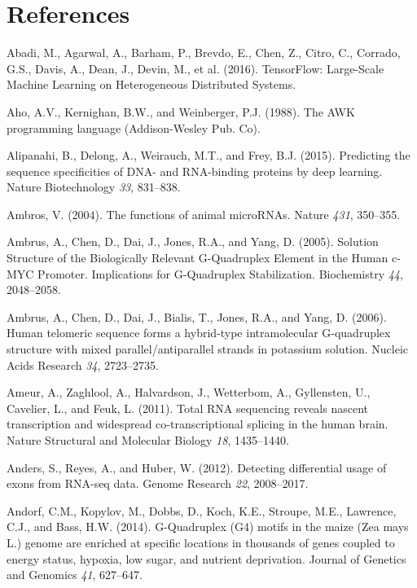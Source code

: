 \documentclass[12pt,a4paper,]{report}
\begin{document}
\newpage
\section*{References}

\hypertarget{refs}{}
\leavevmode\hypertarget{ref-Abadi2016}{}%
Abadi, M., Agarwal, A., Barham, P., Brevdo, E., Chen, Z., Citro, C.,
Corrado, G.S., Davis, A., Dean, J., Devin, M., et al. (2016).
TensorFlow: Large-Scale Machine Learning on Heterogeneous Distributed
Systems.

\leavevmode\hypertarget{ref-Aho1988}{}%
Aho, A.V., Kernighan, B.W., and Weinberger, P.J. (1988). The AWK
programming language (Addison-Wesley Pub. Co).

\leavevmode\hypertarget{ref-Alipanahi2015}{}%
Alipanahi, B., Delong, A., Weirauch, M.T., and Frey, B.J. (2015).
Predicting the sequence specificities of DNA- and RNA-binding proteins
by deep learning. Nature Biotechnology \emph{33}, 831--838.

\leavevmode\hypertarget{ref-Ambros2004}{}%
Ambros, V. (2004). The functions of animal microRNAs. Nature \emph{431},
350--355.

\leavevmode\hypertarget{ref-Ambrus2005}{}%
Ambrus, A., Chen, D., Dai, J., Jones, R.A., and Yang, D. (2005).
Solution Structure of the Biologically Relevant G-Quadruplex Element in
the Human c-MYC Promoter. Implications for G-Quadruplex Stabilization.
Biochemistry \emph{44}, 2048--2058.

\leavevmode\hypertarget{ref-Ambrus2006}{}%
Ambrus, A., Chen, D., Dai, J., Bialis, T., Jones, R.A., and Yang, D.
(2006). Human telomeric sequence forms a hybrid-type intramolecular
G-quadruplex structure with mixed parallel/antiparallel strands in
potassium solution. Nucleic Acids Research \emph{34}, 2723--2735.

\leavevmode\hypertarget{ref-Ameur2011}{}%
Ameur, A., Zaghlool, A., Halvardson, J., Wetterbom, A., Gyllensten, U.,
Cavelier, L., and Feuk, L. (2011). Total RNA sequencing reveals nascent
transcription and widespread co-transcriptional splicing in the human
brain. Nature Structural and Molecular Biology \emph{18}, 1435--1440.

\leavevmode\hypertarget{ref-Anders2012}{}%
Anders, S., Reyes, A., and Huber, W. (2012). Detecting differential
usage of exons from RNA-seq data. Genome Research \emph{22}, 2008--2017.

\leavevmode\hypertarget{ref-Andorf2014}{}%
Andorf, C.M., Kopylov, M., Dobbs, D., Koch, K.E., Stroupe, M.E.,
Lawrence, C.J., and Bass, H.W. (2014). G-Quadruplex (G4) motifs in the
maize (Zea mays L.) genome are enriched at specific locations in
thousands of genes coupled to energy status, hypoxia, low sugar, and
nutrient deprivation. Journal of Genetics and Genomics \emph{41},
627--647.
\end{document}
